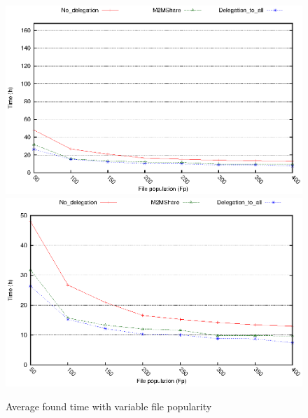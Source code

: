 \begin{figure}[htbp]
\centering%
\subfigure%
{\includegraphics{grafici/tempiVFDiversaPop.eps}}\qquad\qquad
\subfigure%
{\includegraphics{grafici/tempiVFDiversaPop_zoom.eps}}
\caption{Average found time with variable file popularity\label{graficoPopVariabile}}
\end{figure}


\newpage

